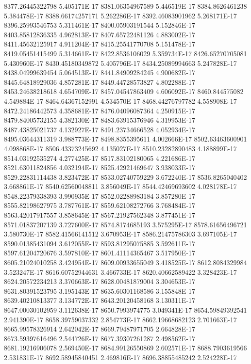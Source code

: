 8377.26445322798  5.405171E-17
8381.06354967589  5.446519E-17
8384.8626461238  5.384478E-17
8388.66174257171  5.262286E-17
8392.46083901962  5.268171E-17
8396.25993546753  5.311461E-17
8400.05903191544  5.152846E-17
8403.85812836335  4.962813E-17
8407.65722481126  4.883002E-17
8411.45632125917  4.911204E-17
8415.25541770708  5.151478E-17
8419.05451415499  5.314661E-17
8422.8536106029  5.359734E-17
8426.65270705081  5.430960E-17
8430.45180349872  5.405796E-17
8434.25089994663  5.247828E-17
8438.04999639454  5.064513E-17
8441.84909284245  4.900682E-17
8445.64818929036  4.857281E-17
8449.44728573827  4.802288E-17
8453.24638218618  4.654709E-17
8457.04547863409  4.606092E-17
8460.844575082  4.549884E-17
8464.64367152991  4.534570E-17
8468.44276797782  4.558908E-17
8472.24186442573  4.358681E-17
8476.04096087364  4.250915E-17
8479.84005732155  4.382130E-17
8483.63915376946  4.319953E-17
8487.43825021737  4.132927E-17
8491.23734666528  4.052934E-17
8495.03644311319  3.988773E-17
8498.8355395611  4.002666E-17
8502.63463600901  4.098868E-17
8506.43373245692  4.135027E-17
8510.23282890483  4.188899E-17
8514.03192535274  4.277425E-17
8517.83102180065  4.221686E-17
8521.63011824856  4.032194E-17
8525.42921469647  3.938033E-17
8529.22831114438  3.823472E-17
8533.02740759229  3.672240E-17
8536.8265040402  3.668861E-17
8540.62560048811  3.856049E-17
8544.42469693602  4.028178E-17
8548.22379338393  3.990935E-17
8552.02288983184  3.857280E-17
8555.82198627975  3.787761E-17
8559.62108272766  3.768484E-17
8563.42017917557  3.858645E-17
8567.21927562348  3.877451E-17
8571.01837207139  3.727600E-17
8574.8174685193  3.575295E-17
8578.61656496721  3.580730E-17
8582.41566141512  3.670953E-17
8586.21475786303  3.697105E-17
8590.01385431094  3.612055E-17
8593.81295075885  3.592611E-17
8597.61204720676  3.597810E-17
8601.41114365467  3.517950E-17
8605.21024010258  3.424954E-17
8609.00933655049  3.418525E-17
8612.8084329984  3.523247E-17
8616.60752944631  3.466733E-17
8620.40662589422  3.328423E-17
8624.20572234213  3.370663E-17
8628.00481879004  3.304653E-17
8631.80391523795  3.195143E-17
8635.60301168586  3.155848E-17
8639.40210813377  3.134772E-17
8643.20120458168  3.130311E-17
8647.00030102959  3.112638E-17
8650.7993974775  3.049341E-17
8654.59849392541  2.941390E-17
8658.39759037332  2.854773E-17
8662.19668682123  2.701663E-17
8665.99578326914  2.642042E-17
8669.79487971705  2.664828E-17
8673.59397616496  2.544726E-17
8677.39307261287  2.498562E-17
8681.19216906078  2.569450E-17
8684.99126550869  2.602571E-17
8688.7903619566  2.531831E-17
8692.58945840451  2.469816E-17
8696.38855485242  2.524228E-17
